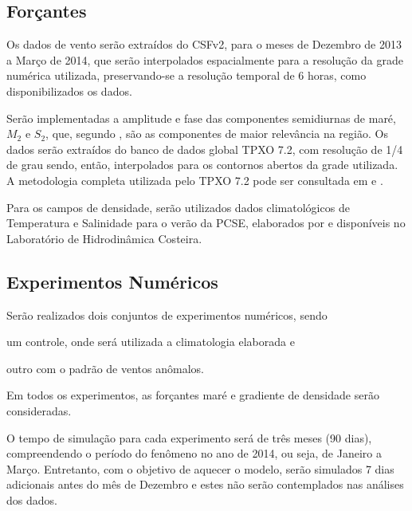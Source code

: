 
\subsection{Forçantes}
\label{sub:forcing}



\hspace{5mm} Os dados de vento serão extraídos do CSFv2, para o meses de Dezembro de 2013 a Março de 2014, que 
serão interpolados espacialmente para a resolução da grade numérica utilizada, preservando-se a resolução
temporal de 6 horas, como disponibilizados os dados.

\hspace{5mm} Serão implementadas a amplitude e fase das componentes semidiurnas de maré,
$M_2$ e $S_2$, que, segundo \citep{mesquita1987harmonic}, são as componentes de maior
relevância na região. Os dados serão extraídos do banco de dados global TPXO 7.2, com
resolução de 1/4 de grau sendo, então, interpolados para os contornos abertos da grade utilizada.
A metodologia completa utilizada pelo TPXO 7.2 pode ser consultada em \citep{Egbert1994}
e \citep{Egbert2002}.

\hspace{5mm} Para os campos de densidade, serão utilizados dados climatológicos de Temperatura
e Salinidade para o verão da PCSE, elaborados por \cite{de2003intrusoes} e disponíveis no
Laboratório de Hidrodinâmica Costeira.


\subsection{Experimentos Numéricos}
\label{sub:numericalExperiments}

\hspace{5mm} Serão realizados dois conjuntos de experimentos numéricos, sendo
\begin{enumerate*}[label=(\alph*)]
  \item um controle, onde será utilizada a climatologia elaborada e
  \item outro com o padrão de ventos anômalos.
\end{enumerate*}
Em todos os experimentos, as forçantes maré e gradiente de densidade serão consideradas.

\hspace{5mm} O tempo de simulação para cada experimento será de três meses (90 dias), compreendendo
o período do fenômeno no ano de 2014, ou seja, de Janeiro a Março. Entretanto, com o objetivo de
aquecer o modelo, serão simulados 7 dias adicionais antes do mês de Dezembro e estes não serão
contemplados nas análises dos dados.